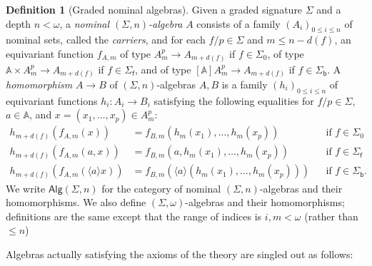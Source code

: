 \documentclass[a4paper,UKenglish,cleveref,thm-restate,numberwithinsect,final]{lipics-v2021}
\newcommand{\Alg}{\mathsf{Alg}}
\newcommand{\sigp}{\Sigma_0}
\newcommand{\sigf}{\Sigma_{\mathsf f}}
\newcommand{\sigb}{\Sigma_{\mathsf b}}
\newcommand{\Names}{\mathbb{A}}
\newcommand{\bind}[1]{\langle #1\rangle}
\theoremstyle{plain}
\numberwithin{equation}{section}
\newcommand{\+}[1]{\mathcal{#1}\xspace}
\theoremstyle{definition}
\newtheorem{defn}[theorem]{Definition}
\begin{document}
\begin{defn}[Graded nominal algebras]
  Given a graded signature \(\Sigma\) and a depth \(n < \omega\), a
  \emph{nominal \((\Sigma, n)\)-algebra} \(A\) consists of a family
  \((A_i)_{0 \le i \le n}\) of nominal sets, called the
  \emph{carriers}, and for each \(f/p \in \Sigma\) and
  $m \le n- d(f)$, an equivariant function $f_{A, m}$ of type
  \(A_m^p \to A_{m + d(f)}\) if $f\in\sigp$, of type
  \(\Names \times A_m^p \to A_{m + d(f)}\) if $f\in\sigf$, and of type
  \( [\Names]A_m^p \to A_{m + d(f)}\) if $f\in\sigb$. A
  \emph{homomorphism} $A\to B$ of \((\Sigma, n)\)-algebras \(A, B\) is
  a family \((h_i)_{0 \le i \le n}\) of equivariant functions
  \(h_i\colon A_i \to B_i\) satisfying the following equalities for
  \(f/p \in \Sigma\), $a\in\Names$, and \(x = (x_1, \ldots, x_p) \in A_m^p\):
  \begin{align*}
    h_{m + d(f)}(f_{A, m}(x)) & = f_{B, m}(h_m(x_1), \ldots, h_m(x_p)) && \text{if $f\in\sigp$}\\
    h_{m + d(f)}(f_{A, m}(a,x)) & = f_{B, m}(a,h_m(x_1), \ldots, h_m(x_p))&& \text{if $f\in\sigf$}\\
    h_{m + d(f)}(f_{A, m}(\bind{a}x)) & = f_{B, m}(\bind{a}(h_m(x_1), \ldots, h_m(x_p))) && \text{if $f\in\sigb$}.
  \end{align*}
  We write \(\Alg(\Sigma, n)\) for the category of nominal
  \((\Sigma, n)\)-algebras and their homomorphisms. We also define
  $(\Sigma,\omega)$-algebras and their homomorphisms; definitions are
  the same except that the range of indices is $i,m<\omega$ (rather
  than $\le n$)
\end{defn}
\noindent Algebras actually satisfying the axioms of the theory are
singled out as follows:
\end{document}
